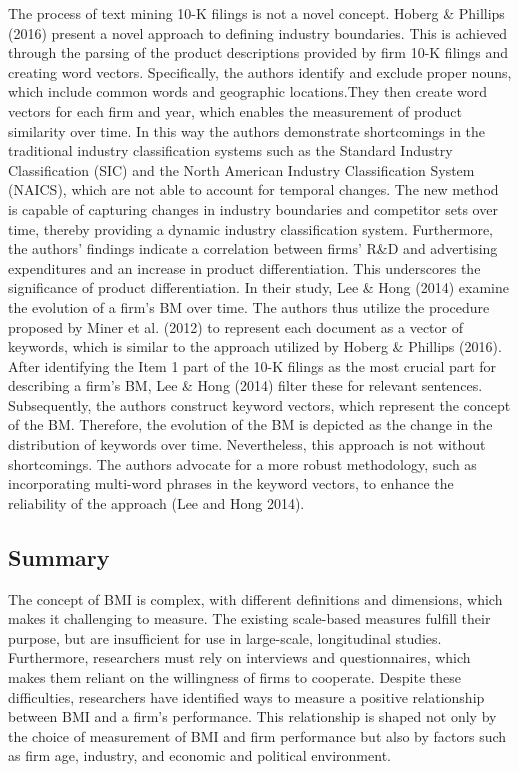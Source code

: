 \documentclass[
]{article}
\begin{document}
The process of text mining 10-K filings is not a novel concept. Hoberg
\& Phillips (2016) present a novel approach to defining industry
boundaries. This is achieved through the parsing of the product
descriptions provided by firm 10-K filings and creating word vectors.
Specifically, the authors identify and exclude proper nouns, which
include common words and geographic locations.They then create word
vectors for each firm and year, which enables the measurement of product
similarity over time. In this way the authors demonstrate shortcomings
in the traditional industry classification systems such as the Standard
Industry Classification (SIC) and the North American Industry
Classification System (NAICS), which are not able to account for
temporal changes. The new method is capable of capturing changes in
industry boundaries and competitor sets over time, thereby providing a
dynamic industry classification system. Furthermore, the authors'
findings indicate a correlation between firms' R\&D and advertising
expenditures and an increase in product differentiation. This
underscores the significance of product differentiation. In their study,
Lee \& Hong (2014) examine the evolution of a firm's BM over time. The
authors thus utilize the procedure proposed by Miner et al. (2012) to
represent each document as a vector of keywords, which is similar to the
approach utilized by Hoberg \& Phillips (2016). After identifying the
Item 1 part of the 10-K filings as the most crucial part for describing
a firm's BM, Lee \& Hong (2014) filter these for relevant sentences.
Subsequently, the authors construct keyword vectors, which represent the
concept of the BM. Therefore, the evolution of the BM is depicted as the
change in the distribution of keywords over time. Nevertheless, this
approach is not without shortcomings. The authors advocate for a more
robust methodology, such as incorporating multi-word phrases in the
keyword vectors, to enhance the reliability of the approach (Lee and
Hong 2014).

\subsection{Summary}\label{summary}

The concept of BMI is complex, with different definitions and
dimensions, which makes it challenging to measure. The existing
scale-based measures fulfill their purpose, but are insufficient for use
in large-scale, longitudinal studies. Furthermore, researchers must rely
on interviews and questionnaires, which makes them reliant on the
willingness of firms to cooperate. Despite these difficulties,
researchers have identified ways to measure a positive relationship
between BMI and a firm's performance. This relationship is shaped not
only by the choice of measurement of BMI and firm performance but also
by factors such as firm age, industry, and economic and political
environment.
\end{document}
